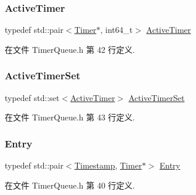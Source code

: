 \subsubsection{\texorpdfstring{Active\+Timer}{ActiveTimer}}
{\footnotesize\ttfamily typedef std\+::pair$<$\hyperlink{classmuduo_1_1Timer}{Timer}$\ast$, int64\+\_\+t$>$ \hyperlink{classmuduo_1_1TimerQueue_a8559b2c5a91f664c629dc1292d484e16}{Active\+Timer}\hspace{0.3cm}{\ttfamily [private]}}



在文件 Timer\+Queue.\+h 第 42 行定义.

\mbox{\label{classmuduo_1_1TimerQueue_ac4562f9443eea7ea7d16c2eab2dad988}} 
\subsubsection{\texorpdfstring{Active\+Timer\+Set}{ActiveTimerSet}}
{\footnotesize\ttfamily typedef std\+::set$<$\hyperlink{classmuduo_1_1TimerQueue_a8559b2c5a91f664c629dc1292d484e16}{Active\+Timer}$>$ \hyperlink{classmuduo_1_1TimerQueue_ac4562f9443eea7ea7d16c2eab2dad988}{Active\+Timer\+Set}\hspace{0.3cm}{\ttfamily [private]}}



在文件 Timer\+Queue.\+h 第 43 行定义.

\mbox{\label{classmuduo_1_1TimerQueue_aa2bab77baf38279fd11dcfcbf8fb15d8}} 
\subsubsection{\texorpdfstring{Entry}{Entry}}
{\footnotesize\ttfamily typedef std\+::pair$<$\hyperlink{classmuduo_1_1Timestamp}{Timestamp}, \hyperlink{classmuduo_1_1Timer}{Timer}$\ast$$>$ \hyperlink{classmuduo_1_1TimerQueue_aa2bab77baf38279fd11dcfcbf8fb15d8}{Entry}\hspace{0.3cm}{\ttfamily [private]}}



在文件 Timer\+Queue.\+h 第 40 行定义.

